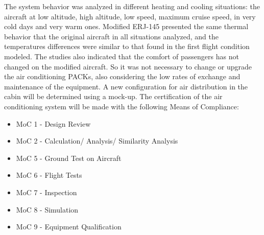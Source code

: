 The system behavior was analyzed in different heating and cooling situations: the aircraft at low altitude, high altitude, low speed, maximum cruise speed, in very cold days and very warm ones.
Modified ERJ-145 presented the same thermal behavior that the original aircraft in all situations analyzed, and the temperatures differences were similar to that found in the first flight condition modeled.
The studies also indicated that the comfort of passengers has not changed on the modified aircraft.
So it was not necessary to change or upgrade the air conditioning PACKs, also considering the low rates of exchange and maintenance of the equipment.
A new configuration for air distribution in the cabin will be determined using a mock-up.
The certification of the air conditioning system will be made with the following Means of Compliance:

\begin{itemize}
  \item MoC 1 - Design Review
  \item MoC 2 - Calculation/ Analysis/ Similarity Analysis
  \item MoC 5 - Ground Test on Aircraft
  \item MoC 6 - Flight Tests
  \item MoC 7 - Inspection
  \item MoC 8 - Simulation
  \item MoC 9 - Equipment Qualification
\end{itemize}